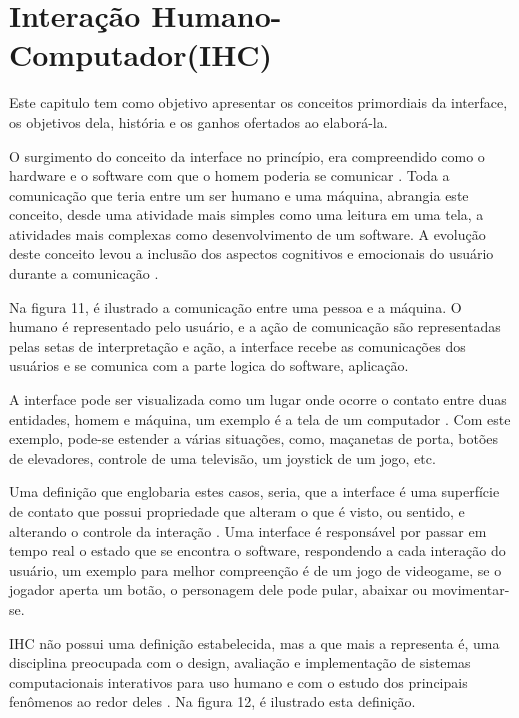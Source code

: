 \documentclass[12pt,oneside,a4paper,chapter=TITLE,section=TITLE,sumario=tradicional]{abntex2}
\begin{document}
\chapter{Interação Humano-Computador(IHC)}
\label{cap:interacao-humano-computador}

Este capitulo tem como objetivo apresentar os conceitos primordiais da interface, os objetivos dela, história e os ganhos ofertados ao elaborá-la. 

O surgimento do conceito da interface no princípio, era compreendido como o hardware e o software com que o homem poderia se comunicar \cite{rocha2003}.  Toda a comunicação que teria entre um ser humano e uma máquina, abrangia este conceito, desde uma atividade mais simples como uma leitura em uma tela, a atividades mais complexas como desenvolvimento de um software. A evolução deste conceito levou a inclusão dos aspectos cognitivos e emocionais do usuário durante a comunicação \cite{rocha2003}.

Na figura 11, é ilustrado a comunicação entre uma pessoa e a máquina. O humano é representado pelo usuário, e a ação de comunicação são representadas pelas setas de interpretação e ação, a interface recebe as comunicações dos usuários e se comunica com a parte logica do software, aplicação.

\begin{figure}[htb]
\end{figure}

A interface pode ser visualizada como um lugar onde ocorre o contato entre duas entidades, homem e máquina, um exemplo é a tela de um computador \cite{rocha2003}. Com este exemplo, pode-se estender a várias situações, como, maçanetas de porta, botões de elevadores, controle de uma televisão, um joystick de um jogo, etc.

Uma definição que englobaria estes casos, seria, que a interface é uma superfície de contato que possui propriedade que alteram o que é visto, ou sentido, e alterando o controle da interação \cite{laurel1993}. Uma interface é responsável por passar em tempo real o estado que se encontra o software, respondendo a cada interação do usuário, um exemplo para melhor compreenção é de um jogo de videogame, se o jogador aperta um botão, o personagem dele pode pular, abaixar ou movimentar-se.

IHC não possui uma definição estabelecida, mas a que mais a representa é, uma disciplina preocupada com o design, avaliação e implementação de sistemas computacionais interativos para uso humano e com o estudo dos principais fenômenos ao redor deles \cite{rocha2003}. Na figura 12, é ilustrado esta definição.
\end{document}
